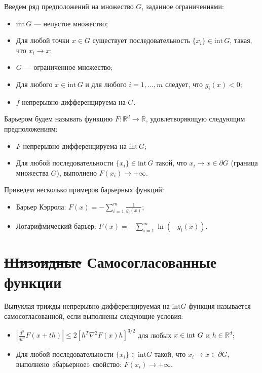 Введем ряд предположений на множество $G$, заданное ограничениями:
\begin{itemize}
    \item $\text{int} \, G$ — непустое множество;
    \item Для любой точки $x \in G$ существует последовательность $\{x_i\} \in \text{int} \, G$, такая, что $x_i \to x$;
    \item $G$ — ограниченное множество;
    \item Для любого $x \in \text{int} \, G$ и для любого $i = 1, \dots, m$ следует, что $g_i(x) < 0$;
    \item $f$ непрерывно дифференцируема на $G$.
\end{itemize}

\begin{definition}
    Барьером будем называть функцию $F : \mathbb{R}^d \to \mathbb{R}$, удовлетворяющую следующим предположениям:
    \begin{itemize}
        \item $F$ непрерывно дифференцируема на $\text{int} \, G$;
        \item Для любой последовательности $\{x_i\} \in \text{int} \, G$ такой, что $x_i \to x \in \partial G$ (граница множества $G$), выполнено $F(x_i) \to +\infty$.
    \end{itemize}
\end{definition}

\begin{example}
    Приведем несколько примеров барьерных функций:
    \begin{itemize}
        \item Барьер Кэррола: $F(x) = -\sum_{i=1}^m \frac{1}{g_i(x)}$;
        \item Логарифмический барьер: $F(x) = -\sum_{i=1}^m \ln(-g_i(x))$.
    \end{itemize}
\end{example}

\section*{\texorpdfstring{\sout{Шизоидные}}{d} Самосогласованные функции}

\begin{definition}
    Выпуклая трижды непрерывно дифференцируемая на $\text{int}G$ функция называется самосогласованной, если выполнены следующие условия:
    \begin{itemize}
        \item $\left|\frac{d^3}{dt^3} F(x + th)\right| \leq 2[h^T \nabla^2 F(x) h]^{3/2}$ для любых $x \in \operatorname{int \,} G$ и $h \in \mathbb{R}^d$;
        \item Для любой последовательности $\{x_i\} \in \text{int}G$ такой, что $x_i \to x \in \partial G$, выполнено «барьерное» свойство: $F(x_i) \to +\infty$.
    \end{itemize}
\end{definition}

